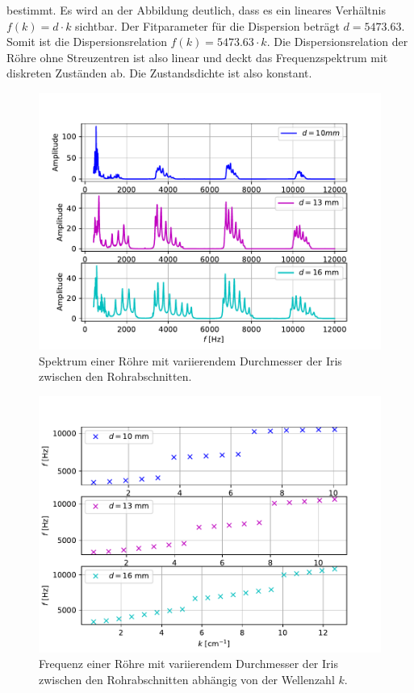 bestimmt. Es wird an der Abbildung deutlich, dass es ein lineares Verhältnis $f(k)=d\cdot k$ sichtbar. Der Fitparameter für die Dispersion beträgt $d=5473.63$.
Somit ist die Dispersionsrelation $f(k)=5473.63\cdot k$. Die Dispersionsrelation der Röhre ohne Streuzentren ist also linear und deckt das Frequenzspektrum mit diskreten
Zuständen ab. Die Zustandsdichte ist also konstant.
\begin{figure}
  \centering
  \includegraphics[scale=0.5]{Messwerte/plot6.pdf}
  \caption{Spektrum einer Röhre mit variierendem Durchmesser der Iris zwischen den Rohrabschnitten.}
  \label{fig:plot6}
\end{figure}
\begin{figure}
  \centering
  \includegraphics[scale=0.5]{Messwerte/plot7.pdf}
  \caption{Frequenz einer Röhre mit variierendem Durchmesser der Iris zwischen den Rohrabschnitten abhängig von der Wellenzahl $k$.}
  \label{fig:plot7}
\end{figure}
